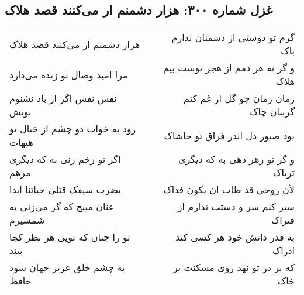 \begin{center}
\section*{غزل شماره ۳۰۰: هزار دشمنم ار می‌کنند قصد هلاک}
\label{sec:sh300}
\begin{longtable}{l p{0.5cm} r}
هزار دشمنم ار می‌کنند قصد هلاک
&&
گرم تو دوستی از دشمنان ندارم باک
\\
مرا امید وصال تو زنده می‌دارد
&&
و گر نه هر دمم از هجر توست بیم هلاک
\\
نفس نفس اگر از باد نشنوم بویش
&&
زمان زمان چو گل از غم کنم گریبان چاک
\\
رود به خواب دو چشم از خیال تو هیهات
&&
بود صبور دل اندر فراق تو حاشاک
\\
اگر تو زخم زنی به که دیگری مرهم
&&
و گر تو زهر دهی به که دیگری تریاک
\\
بضرب سیفک قتلی حیاتنا ابدا
&&
لأن روحی قد طاب ان یکون فداک
\\
عنان مپیچ که گر می‌زنی به شمشیرم
&&
سپر کنم سر و دستت ندارم از فتراک
\\
تو را چنان که تویی هر نظر کجا بیند
&&
به قدر دانش خود هر کسی کند ادراک
\\
به چشم خلق عزیز جهان شود حافظ
&&
که بر در تو نهد روی مسکنت بر خاک
\\
\end{longtable}
\end{center}
